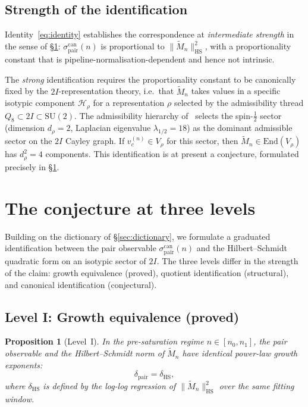 \documentclass[12pt,a4paper]{article}
\newtheorem{proposition}[theorem]{Proposition}
\theoremstyle{definition}
\theoremstyle{remark}
\begin{document}
  \subsection{Strength of the identification}
  \label{sec:dict-strength}

  Identity~\eqref{eq:identity} establishes the correspondence at \emph{intermediate
  strength} in the sense of §\ref{sec:conjecture}: $\sigma^{\mathrm{can}}_{\mathrm{pair}}(n)$
  is proportional to $\|\widetilde{M}_n\|_{\mathrm{HS}}^2$, with a proportionality
  constant that is pipeline-normalisation-dependent and hence not intrinsic.

  The \emph{strong} identification requires the proportionality constant to be
  canonically fixed by the $2I$-representation theory, i.e.\ that $\widetilde{M}_n$
  takes values in a specific isotypic component $\mathcal{H}_\rho$ for a
  representation $\rho$ selected by the admissibility thread
  $Q_8 \subset 2I \subset \mathrm{SU}(2)$.
  The admissibility hierarchy of~\cite{Beau2026a1} selects the spin-$\frac{1}{2}$
  sector (dimension $d_\rho = 2$, Laplacian eigenvalue $\lambda_{1/2} = 18$) as
  the dominant admissible sector on the $2I$ Cayley graph.
  If $v_c^{(n)} \in V_\rho$ for this sector, then $\widetilde{M}_n \in \mathrm{End}(V_\rho)$
  has $d_\rho^2 = 4$ components.
  This identification is at present a conjecture, formulated precisely in §\ref{sec:conjecture}.

  \section{The conjecture at three levels}
  \label{sec:conjecture}

  Building on the dictionary of §\ref{sec:dictionary}, we formulate a graduated
  identification between the pair observable $\sigma^{\mathrm{can}}_{\mathrm{pair}}(n)$
  and the Hilbert--Schmidt quadratic form on an isotypic sector of $2I$.
  The three levels differ in the strength of the claim: growth equivalence (proved),
  quotient identification (structural), and canonical identification (conjectural).

  \subsection{Level I: Growth equivalence (proved)}
    \label{sec:level1}

    \begin{proposition}[Level~I]
  In the pre-saturation regime $n \in [n_0, n_1]$, the pair observable and the
  Hilbert--Schmidt norm of $\widetilde{M}_n$ have identical power-law growth exponents:
  \begin{equation}
    \delta_{\mathrm{pair}} = \delta_{\mathrm{HS}},
    \label{eq:level1}
  \end{equation}
  where $\delta_{\mathrm{HS}}$ is defined by the log-log regression of
  $\|\widetilde{M}_n\|_{\mathrm{HS}}^2$ over the same fitting window.
    \end{proposition}
\end{document}
